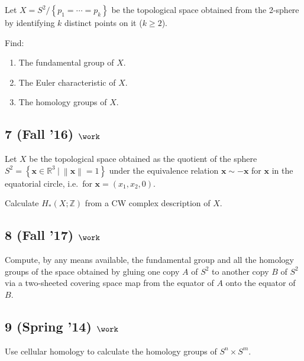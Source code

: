 Let \(X = S^2 / \left\{{p_1 = \cdots = p_k }\right\}\) be the
topological space obtained from the 2-sphere by identifying \(k\)
distinct points on it (\(k \geq 2\)).

Find:

\begin{enumerate}
\def\labelenumi{\alph{enumi}.}
\item
  The fundamental group of \(X\).
\item
  The Euler characteristic of \(X\).
\item
  The homology groups of \(X\).
\end{enumerate}

\hypertarget{fall-16-work-4}{%
\subsection{\texorpdfstring{7 (Fall '16)
\(\work\)}{7 (Fall '16) \textbackslash work}}\label{fall-16-work-4}}

Let \(X\) be the topological space obtained as the quotient of the
sphere
\(S^2 = \left\{{\mathbf{x} \in {\mathbb{R}}^3 {~\mathrel{\Big|}~}{\left\lVert {\mathbf{x}} \right\rVert} = 1}\right\}\)
under the equivalence relation \(\mathbf{x} \sim -\mathbf{x}\) for
\(\mathbf{x}\) in the equatorial circle, i.e.~for
\(\mathbf{x} = (x_1, x_2, 0)\).

Calculate \(H_* (X; {\mathbb{Z}})\) from a CW complex description of
\(X\).

\hypertarget{fall-17-work-2}{%
\subsection{\texorpdfstring{8 (Fall '17)
\(\work\)}{8 (Fall '17) \textbackslash work}}\label{fall-17-work-2}}

Compute, by any means available, the fundamental group and all the
homology groups of the space obtained by gluing one copy \(A\) of
\(S^2\) to another copy \(B\) of \(S^2\) via a two-sheeted covering
space map from the equator of \(A\) onto the equator of \(B\).

\hypertarget{spring-14-work-1}{%
\subsection{\texorpdfstring{9 (Spring '14)
\(\work\)}{9 (Spring '14) \textbackslash work}}\label{spring-14-work-1}}

Use cellular homology to calculate the homology groups of
\(S^n \times S^m\).


